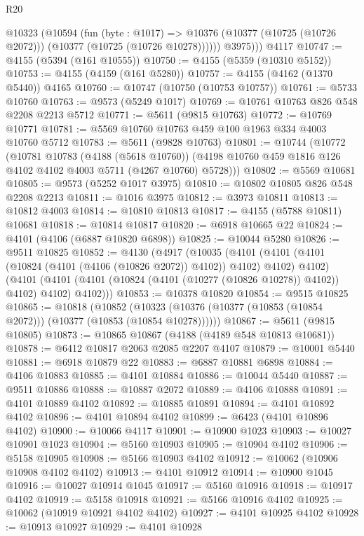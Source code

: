 \begin{lexlean}{R20}
\begin{coremodule}
        @10323
          (@10594
            (fun (byte : @1017) =>
            @10376 (@10377 (@10725 (@10726 @2072))) (@10377 (@10725 (@10726 @10278))))))
          @3975)))
    @4117
@10747 := @4155 (@5394 (@161 @10555))
@10750 := @4155 (@5359 (@10310 @5152))
@10753 := @4155 (@4159 (@161 @5280))
@10757 := @4155 (@4162 (@1370 @5440)) @4165
@10760 := @10747 (@10750 (@10753 @10757))
@10761 := @5733 @10760
@10763 := @9573 (@5249 @1017)
@10769 := @10761 @10763 @826 @548 @2208 @2213 @5712
@10771 := @5611 (@9815 @10763)
@10772 := @10769 @10771
@10781 := @5569 @10760 @10763 @459 @100 @1963 @334 @4003 @10760 @5712
@10783 := @5611 (@9828 @10763)
@10801 := @10744
    (@10772
      (@10781
        @10783
        (@4188 (@5618 @10760))
        (@4198 @10760 @459 @1816 @126 @4102 @4102 @4003 @5711 (@4267 @10760) @5728)))
@10802 := @5569 @10681
@10805 := @9573 (@5252 @1017 @3975)
@10810 := @10802 @10805 @826 @548 @2208 @2213
@10811 := @1016 @3975
@10812 := @3973 @10811
@10813 := @10812 @4003
@10814 := @10810 @10813
@10817 := @4155 (@5788 @10811) @10681
@10818 := @10814 @10817
@10820 := @6918 @10665 @22
@10824 := @4101 (@4106 (@6887 @10820 @6898))
@10825 := @10044 @5280
@10826 := @9511 @10825
@10852 := @4130
    (@4917
      (@10035
        (@4101 (@4101 (@4101 (@10824 (@4101 (@4106 (@10826 @2072)) @4102)) @4102) @4102) @4102)
        (@4101 (@4101 (@4101 (@10824 (@4101 (@10277 (@10826 @10278)) @4102)) @4102) @4102) @4102)))
@10853 := @10378 @10820
@10854 := @9515 @10825
@10865 := @10818
    (@10852 (@10323 (@10376 (@10377 (@10853 (@10854 @2072))) (@10377 (@10853 (@10854 @10278))))))
@10867 := @5611 (@9815 @10805)
@10873 := @10865 @10867 (@4188 (@4189 @548 @10813 @10681))
@10878 := @6412 @10817 @2063 @2085 @2207 @4107
@10879 := @10001 @5440
@10881 := @6918 @10879 @22
@10883 := @6887 @10881 @6898
@10884 := @4106 @10883
@10885 := @4101 @10884
@10886 := @10044 @5440
@10887 := @9511 @10886
@10888 := @10887 @2072
@10889 := @4106 @10888
@10891 := @4101 @10889 @4102
@10892 := @10885 @10891
@10894 := @4101 @10892 @4102
@10896 := @4101 @10894 @4102
@10899 := @6423 (@4101 @10896 @4102)
@10900 := @10066 @4117
@10901 := @10900 @1023
@10903 := @10027 @10901 @1023
@10904 := @5160 @10903
@10905 := @10904 @4102
@10906 := @5158 @10905
@10908 := @5166 @10903 @4102
@10912 := @10062 (@10906 @10908 @4102 @4102)
@10913 := @4101 @10912
@10914 := @10900 @1045
@10916 := @10027 @10914 @1045
@10917 := @5160 @10916
@10918 := @10917 @4102
@10919 := @5158 @10918
@10921 := @5166 @10916 @4102
@10925 := @10062 (@10919 @10921 @4102 @4102)
@10927 := @4101 @10925 @4102
@10928 := @10913 @10927
@10929 := @4101 @10928

\end{coremodule}
\end{lexlean}
